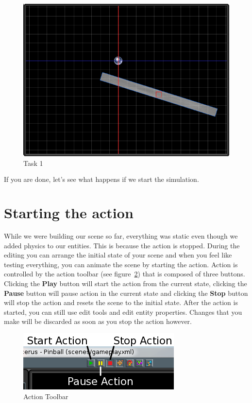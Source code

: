 \documentclass[a4paper,12pt]{article}
\begin{document}
\begin{figure}[ht]
 \begin{center}
  \includegraphics[scale=0.65]{Task1}
 \end{center}
 \caption{Task 1}
 \label{fig:task_1}
\end{figure}

If you are done, let's see what happens if we start the simulation.

\section{Starting the action}
While we were building our scene so far, everything was static even though we added physics to our entities. This is because the action is stopped. During the editing you can arrange the initial state of your scene and when you feel like testing everything, you can animate the scene by starting the action. Action is controlled by the action toolbar (see figure~\ref{fig:action_toolbar}) that is composed of three buttons. Clicking the \textbf{Play} button will start the action from the current state, clicking the \textbf{Pause} button will pause action in the current state and clicking the \textbf{Stop} button will stop the action and resets the scene to the initial state. After the action is started, you can still use edit tools and edit entity properties. Changes that you make will be discarded as soon as you stop the action however.

\begin{figure}[ht]
 \begin{center}
  \includegraphics[scale=0.65]{ActionToolbar}
 \end{center}
 \caption{Action Toolbar}
 \label{fig:action_toolbar}
\end{figure}
\end{document}
